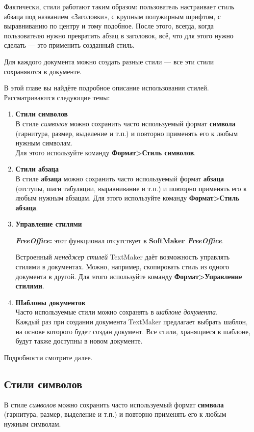 \documentclass[a4paper,10pt]{article}
\begin{document}
Фактически, стили работают таким образом: пользователь настраивает стиль абзаца под названием «Заголовки», с крупным полужирным шрифтом, с выравниванию по центру и тому подобное. После этого, всегда, когда пользователю нужно превратить абзац в заголовок, всё, что для этого нужно сделать --- это применить созданный стиль.

Для каждого документа можно создать разные стили --- все эти стили сохраняются в документе.

В этой главе вы найдёте подробное описание использования стилей. Рассматриваются следующие темы:
\begin{enumerate}
 \item \textbf{Стили символов}\\
 В стиле \textit{символов} можно сохранить часто используемый формат \textbf{символа} (гарнитура, размер, выделение и т.п.) и повторно применять его к любым нужным символам.\\
Для этого используйте команду \textbf{Формат>Стиль символов}.
\item \textbf{Стили абзаца}\\
В стиле \textbf{абзаца} можно сохранить часто используемый формат \textbf{абзаца} (отступы, шаги табуляции, выравнивание и т.п.) и повторно применять его к любым нужным абзацам.
Для этого используйте команду \textbf{Формат>Стиль абзаца}.
\item \textbf{Управление стилями}\\
\begin{mdframed}[backgroundcolor=pink!50]
\textbf{\textit{FreeOffice}:} этот функционал отсутствует в \textbf{SoftMaker \textit{FreeOffice}}.
\end{mdframed}
Встроенный \textit{менеджер стилей} TextMaker даёт возможность управлять стилями в документах. Можно, например, скопировать стиль из одного документа в другой.
Для этого используйте команду \textbf{Формат>Управление стилями}.
\item \textbf{Шаблоны документов}\\
Часто используемые стили можно сохранять в \textit{шаблоне документа}.\\
Каждый раз при создании документа TextMaker предлагает выбрать шаблон, на основе которого будет создан документ. Все стили, хранящиеся в шаблоне, будут также доступны в новом документе.
\end{enumerate}

Подробности смотрите далее.

\subsection{Стили символов}
В стиле \textit{символов} можно сохранить часто используемый формат \textbf{символа} (гарнитура, размер, выделение и т.п.) и повторно применять его к любым нужным символам.
\end{document}
